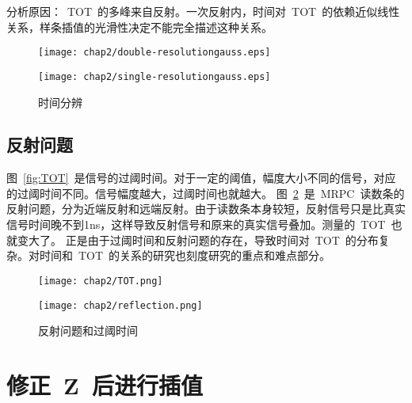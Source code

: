 分析原因：~TOT~的多峰来自反射。一次反射内，时间对~TOT~的依赖近似线性关系，样条插值的光滑性决定不能完全描述这种关系。
\begin{figure}[!h]
\begin{minipage}[!h]{0.5\linewidth}
\texttt{[image: chap2/double-resolutiongauss.eps]}
\label{fig:double-resolutiongauss}
\end{minipage}%
\hfill
\begin{minipage}[!h]{0.5\linewidth}
\texttt{[image: chap2/single-resolutiongauss.eps]}
\label{fig:single-resolutiongauss}
\end{minipage}
\caption{时间分辨}
\end{figure}

\subsection{反射问题}


图~\ref{fig:TOT}~是信号的过阈时间。对于一定的阈值，幅度大小不同的信号，对应的过阈时间不同。信号幅度越大，过阈时间也就越大。
图~\ref{fig:reflection}~是~MRPC~读数条的反射问题，分为近端反射和远端反射。由于读数条本身较短，反射信号只是比真实信号时间晚不到1ns，这样导致反射信号和原来的真实信号叠加。测量的~TOT~也就变大了。
正是由于过阈时间和反射问题的存在，导致时间对~TOT~的分布复杂。对时间和~TOT~的关系的研究也刻度研究的重点和难点部分。

\begin{figure}[!h]
\begin{minipage}[!h]{0.5\linewidth}
\texttt{[image: chap2/TOT.png]}
\label{fig:TOT}
\end{minipage}
\hfill
\begin{minipage}[!h]{0.5\linewidth}
\texttt{[image: chap2/reflection.png]}
\label{fig:reflection}
\end{minipage}%
\caption{反射问题和过阈时间}
\end{figure}


\section{修正~Z~后进行插值}


